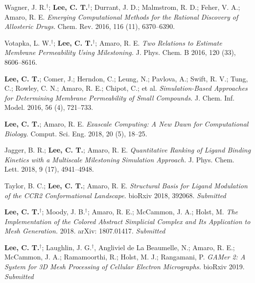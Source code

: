 \begin{frontmatter}
\begin{vitapage}
\begin{publications}
  \item Wagner, J. R.$^{\dagger}$; \textbf{Lee, C. T.$^{\dagger}$}; Durrant, J. D.; Malmstrom, R. D.; Feher, V. A.; Amaro, R. E. \emph{Emerging Computational Methods for the Rational Discovery of Allosteric Drugs.} Chem. Rev. 2016, 116 (11), 6370–6390.
  \item Votapka, L. W.$^{\dagger}$; \textbf{Lee, C. T.$^{\dagger}$}; Amaro, R. E. \emph{Two Relations to Estimate Membrane Permeability Using Milestoning.} J. Phys. Chem. B 2016, 120 (33), 8606–8616.
  \item \textbf{Lee, C. T.}; Comer, J.; Herndon, C.; Leung, N.; Pavlova, A.; Swift, R. V.; Tung, C.; Rowley, C. N.; Amaro, R. E.; Chipot, C.; et al. \emph{Simulation-Based Approaches for Determining Membrane Permeability of Small Compounds.} J. Chem. Inf. Model. 2016, 56 (4), 721–733.
  \item \textbf{Lee, C. T.}; Amaro, R. E. \emph{Exascale Computing: A New Dawn for Computational Biology.} Comput. Sci. Eng. 2018, 20 (5), 18–25.
  \item Jagger, B. R.; \textbf{Lee, C. T.}; Amaro, R. E. \emph{Quantitative Ranking of Ligand Binding Kinetics with a Multiscale Milestoning Simulation Approach.} J. Phys. Chem. Lett. 2018, 9 (17), 4941–4948.
  \item Taylor, B. C.; \textbf{Lee, C. T.}; Amaro, R. E. \emph{Structural Basis for Ligand Modulation of the CCR2 Conformational Landscape.} bioRxiv 2018, 392068. \textit{Submitted}
  \item \textbf{Lee, C. T.$^{\dagger}$}; Moody, J. B.$^{\dagger}$; Amaro, R. E.; McCammon, J. A.; Holst, M. \emph{The Implementation of the Colored Abstract Simplicial Complex and Its Application to Mesh Generation.} 2018. arXiv: 1807.01417. \textit{Submitted}
  \item \textbf{Lee, C. T.$^{\dagger}$}; Laughlin, J. G.$^{\dagger}$, Angliviel de La Beaumelle, N.; Amaro, R. E.; McCammon, J. A.; Ramamoorthi, R.; Holst, M. J.; Rangamani, P. \emph{GAMer 2: A System for 3D Mesh Processing of Cellular Electron Micrographs.} bioRxiv 2019. \textit{Submitted}
\end{publications}
\end{vitapage}


\end{frontmatter}
